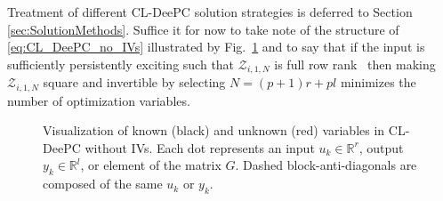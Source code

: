 Treatment of different \ac{CL-DeePC} solution strategies is deferred to Section \ref{sec:SolutionMethods}. Suffice it for now to take note of the structure of \eqref{eq:CL_DeePC_no_IVs} illustrated by Fig.~\ref{fig:CL-DeePC} and to say that if the input is sufficiently persistently exciting such that $\mathcal{Z}_{i,1,N}$ is full row rank~\cite[Chapt.~9.6.1]{Verhaegen2007a} then making $\mathcal{Z}_{i,1,N}$ square and invertible by selecting $N=(p+1)r+pl$ minimizes the number of optimization variables.
% 
% 
\begin{figure}[t!]
\centering

\caption{Visualization of known (black) and unknown (red) variables in \ac{CL-DeePC} without \ac{IVs}. Each dot represents an input $u_k\in\mathbb{R}^r$, output $y_k\in\mathbb{R}^l$, or element of the matrix $G$. Dashed block-anti-diagonals are composed of the same $u_k$ or $y_k$.}
\label{fig:CL-DeePC}
\end{figure}

